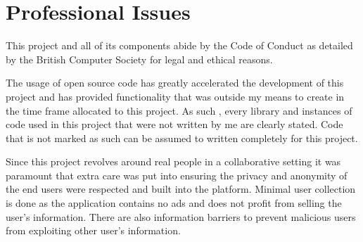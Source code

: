 \chapter{Professional Issues}

This project and all of its components abide by the Code of Conduct as detailed by the British Computer Society \cite{conduct} for legal and ethical reasons.

The usage of open source code has greatly accelerated the development of this project and has provided functionality that was outside my means to create in the time frame allocated to this project. As such , every library and instances of code used in this project that were not written by me are clearly stated. Code that is not marked as such can be assumed to written completely for this project.

Since this project revolves around real people in a collaborative setting it was paramount that extra care was put into ensuring the privacy and anonymity of the end users were respected and built into the platform. Minimal user collection is done as the application contains no ads and does not profit from selling the user's information. There are also information barriers to prevent malicious users from exploiting other user's information.